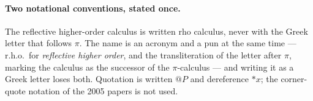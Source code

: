 \documentclass[11pt]{article}
\makeatletter
\theoremstyle{definition}
\theoremstyle{plain}
\newcommand{\rhoc}{\textsf{rho}}
\newcommand{\quot}[1]{@#1}
\newcommand{\drop}[1]{{*}#1}
\makeatother
\begin{document}
\paragraph{Two notational conventions, stated once.}
The reflective higher-order calculus is written \rhoc{} calculus, never with the
Greek letter that follows $\pi$. The name is an acronym and a pun at the same
time --- r.h.o.\ for \emph{reflective higher order}, and the transliteration of
the letter after $\pi$, marking the calculus as the successor of the
$\pi$-calculus --- and writing it as a Greek letter loses both. Quotation is
written $\quot{P}$ and dereference $\drop{x}$; the corner-quote notation of the
2005 papers is not used.

\newpage

\newpage

\newpage

\newpage

\newpage

\newpage

\newpage

\newpage

\newpage

\end{document}
